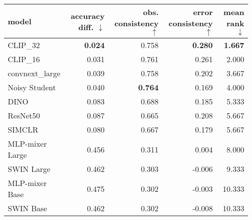 \begin{tabular}{lrrrr}
\toprule
          model & accuracy diff. $\downarrow$ & obs. consistency $\uparrow$ & error consistency $\uparrow$ & mean rank $\downarrow$ \\
\midrule
       CLIP\_32 &              \textbf{0.024} &                       0.758 &               \textbf{0.280} &         \textbf{1.667} \\
       CLIP\_16 &                       0.031 &                       0.761 &                        0.261 &                  2.000 \\
convnext\_large &                       0.039 &                       0.758 &                        0.202 &                  3.667 \\
  Noisy Student &                       0.040 &              \textbf{0.764} &                        0.169 &                  4.000 \\
           DINO &                       0.083 &                       0.688 &                        0.185 &                  5.333 \\
       ResNet50 &                       0.087 &                       0.665 &                        0.208 &                  5.667 \\
         SIMCLR &                       0.080 &                       0.667 &                        0.179 &                  5.667 \\
MLP-mixer Large &                       0.456 &                       0.311 &                        0.004 &                  8.000 \\
     SWIN Large &                       0.462 &                       0.303 &                       -0.006 &                  9.333 \\
 MLP-mixer Base &                       0.475 &                       0.302 &                       -0.003 &                 10.333 \\
      SWIN Base &                       0.462 &                       0.302 &                       -0.008 &                 10.333 \\
\bottomrule
\end{tabular}

